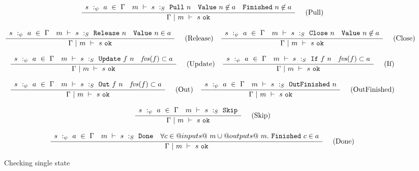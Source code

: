 \begin{figure*}

$$
\frac {\displaystyle 
    \begin{array}{lccr}
        s~:_\psi~ a ~\in~ \Gamma                    &
        m ~\vdash~ s ~:_S~ \mathtt{Pull}~n    &
        \mathtt{Value}~n \not\in a             &
        \mathtt{Finished}~n \not\in a
    \end{array}
} {\displaystyle  
    \Gamma ~|~ m ~\vdash~ s~\mathtt{ok}
} \ 
\quad
\textrm{(Pull)}
$$

$$
\frac {\displaystyle 
    \begin{array}{lcr}
        s~:_\psi~ a ~\in~ \Gamma                        &
        m ~\vdash~ s ~:_S~ \mathtt{Release}~n    &
        \mathtt{Value}~n \in a
    \end{array}
} {\displaystyle  
    \Gamma ~|~ m ~\vdash~ s~\mathtt{ok}
} \ 
\quad
\textrm{(Release)}
\quad
\frac {\displaystyle 
    \begin{array}{lcr}
        s~:_\psi~ a ~\in~ \Gamma                    &
        m ~\vdash~ s ~:_S~ \mathtt{Close}~n    &
        \mathtt{Value}~n \not\in a
    \end{array}
} {\displaystyle  
    \Gamma ~|~ m ~\vdash~ s~\mathtt{ok}
} \ 
\quad
\textrm{(Close)}
$$

$$
\frac {\displaystyle 
    \begin{array}{lcr}
        s~:_\psi~ a ~\in~ \Gamma                        &
        m ~\vdash~ s ~:_S~ \mathtt{Update}~f~n    &
        \mathit{fvs}(f) \subset a
    \end{array}
} {\displaystyle  
    \Gamma ~|~ m ~\vdash~ s~\mathtt{ok}
} \ 
\quad
\textrm{(Update)}
\quad
\frac {\displaystyle 
    \begin{array}{lcr}
        s~:_\psi~ a ~\in~ \Gamma                        &
        m ~\vdash~ s ~:_S~ \mathtt{If}~f~n    &
        \mathit{fvs}(f) \subset a
    \end{array}
} {\displaystyle  
    \Gamma ~|~ m ~\vdash~ s~\mathtt{ok}
} \ 
\quad
\textrm{(If)}
$$

$$
\frac {\displaystyle 
    \begin{array}{lcr}
        s~:_\psi~ a ~\in~ \Gamma                      &
        m ~\vdash~ s ~:_S~ \mathtt{Out}~f~n    &
        \mathit{fvs}(f) \subset a
    \end{array}
} {\displaystyle  
    \Gamma ~|~ m ~\vdash~ s~\mathtt{ok}
} \ 
\quad
\textrm{(Out)}
\quad
\frac {\displaystyle 
    \begin{array}{lr}
        s~:_\psi~ a ~\in~ \Gamma                            &
        m ~\vdash~ s ~:_S~ \mathtt{OutFinished}~n
    \end{array}
} {\displaystyle  
    \Gamma ~|~ m ~\vdash~ s~\mathtt{ok}
} \ 
\quad
\textrm{(OutFinished)}
$$

$$
\frac {\displaystyle 
    \begin{array}{lr}
        s~:_\psi~ a ~\in~ \Gamma                &
        m ~\vdash~ s ~:_S~ \mathtt{Skip}
    \end{array}
} {\displaystyle  
    \Gamma ~|~ m ~\vdash~ s~\mathtt{ok}
} \ 
\quad
\textrm{(Skip)}
$$

$$
\frac {\displaystyle 
    \begin{array}{lcr}
        s~:_\psi~ a ~\in~ \Gamma                &
        m ~\vdash~ s ~:_S~ \mathtt{Done}    &
        \forall c \in @inputs@~m \cup @outputs@~m.~ \mathtt{Finished}~c \in a
    \end{array}
} {\displaystyle  
    \Gamma ~|~ m ~\vdash~ s~\mathtt{ok}
} \ 
\quad
\textrm{(Done)}
$$

\caption{Checking single state}
\label{fig:inv:checking}
\end{figure*}

